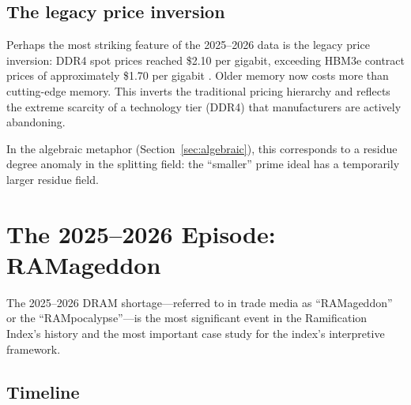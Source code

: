 \documentclass[12pt]{article}
\theoremstyle{definition}
\begin{document}
\subsection{The legacy price inversion}

Perhaps the most striking feature of the 2025--2026 data is the legacy price inversion: DDR4 spot prices reached \$2.10 per gigabit, exceeding HBM3e contract prices of approximately \$1.70 per gigabit \cite{Sourceability2026}. Older memory now costs more than cutting-edge memory. This inverts the traditional pricing hierarchy and reflects the extreme scarcity of a technology tier (DDR4) that manufacturers are actively abandoning.

In the algebraic metaphor (Section~\ref{sec:algebraic}), this corresponds to a residue degree anomaly in the splitting field: the ``smaller'' prime ideal has a temporarily larger residue field.


\section{The 2025--2026 Episode: RAMageddon}
\label{sec:ramageddon}

The 2025--2026 DRAM shortage---referred to in trade media as ``RAMageddon'' or the ``RAMpocalypse''---is the most significant event in the Ramification Index's history and the most important case study for the index's interpretive framework.

\subsection{Timeline}
\end{document}
